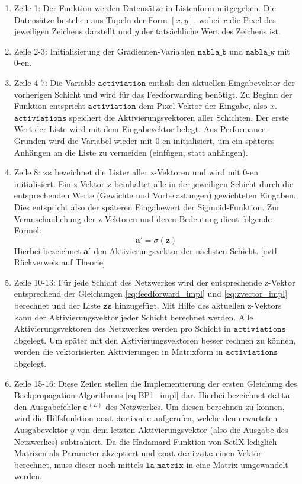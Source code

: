 \begin{enumerate}
\item Zeile 1: Der Funktion werden Datensätze in Listenform mitgegeben. Die Datensätze bestehen aus Tupeln der Form $[x,y]$, wobei $x$ die Pixel des jeweiligen Zeichens darstellt und $y$ der tatsächliche Wert des Zeichens ist.
\item Zeile 2-3: Initialisierung der Gradienten-Variablen $\mathtt{nabla\_b}$ und $\mathtt{nabla\_w}$ mit 0-en.
\item Zeile 4-7: Die Variable $\mathtt{activiation}$ enthält den aktuellen Eingabevektor der vorherigen Schicht und wird für das Feedforwarding benötigt. Zu Beginn der Funktion entspricht $\mathtt{activiation}$ dem Pixel-Vektor der Eingabe, also $x$. $\mathtt{activiations}$ speichert die Aktivierungsvektoren aller Schichten. Der erste Wert der Liste wird mit dem Eingabevektor belegt. Aus Performance-Gründen wird die Variabel wieder mit 0-en initialisiert, um ein späteres Anhängen an die Liste zu vermeiden (einfügen, statt anhängen).
\item Zeile 8: $\mathtt{zs}$ bezeichnet die Lister aller z-Vektoren und wird mit 0-en initialisiert. Ein z-Vektor $\mathtt{z}$ beinhaltet alle in der jeweiligen Schicht durch die entsprechenden Werte (Gewichte und Vorbelastungen) gewichteten Eingaben. Dies entspricht also der späteren Eingabewert der Sigmoid-Funktion. Zur Veranschaulichung der z-Vektoren und deren Bedeutung dient folgende Formel:
\begin{equation} \label{eq:zvector_impl}
	\mathbf{a}' = \sigma(\mathbf{z})
\end{equation} 
Hierbei bezeichnet $\mathbf{a}'$ den Aktivierungsvektor der nächsten Schicht. [evtl. Rückverweis auf Theorie]
\item Zeile 10-13: Für jede Schicht des Netzwerkes wird der entsprechende z-Vektor entsprechend der Gleichungen \eqref{eq:feedforward_impl} und \eqref{eq:zvector_impl} berechnet und der Liste $\mathtt{zs}$ hinzugefügt. Mit Hilfe des aktuellen z-Vektors kann der Aktivierungsvektor jeder Schicht berechnet werden. Alle Aktivierungsvektoren des Netzwerkes werden pro Schicht in $\mathtt{activiations}$ abgelegt. Um später mit den Aktivierungsvektoren besser rechnen zu können, werden die vektorisierten Aktivierungen in Matrixform in $\mathtt{activiations}$ abgelegt.
\item Zeile 15-16: Diese Zeilen stellen die Implementierung der ersten Gleichung des Backpropagation-Algorithmus \eqref{eq:BP1_impl} dar. Hierbei bezeichnet $\mathtt{delta}$ den Ausgabefehler $\boldsymbol{\varepsilon}^{(L)}$ des Netzwerkes. Um diesen berechnen zu können, wird die Hilfsfunktion $\mathtt{cost\_derivate}$ aufgerufen, welche den erwarteten Ausgabevektor $y$ von dem letzten Aktivierungsvektor (also die Ausgabe des Netzwerkes) subtrahiert. Da die Hadamard-Funktion von SetlX lediglich Matrizen als Parameter akzeptiert und $\mathtt{cost\_derivate}$ einen Vektor berechnet, muss dieser noch mittels $\mathtt{la\_matrix}$ in eine Matrix umgewandelt werden.

\end{enumerate}
